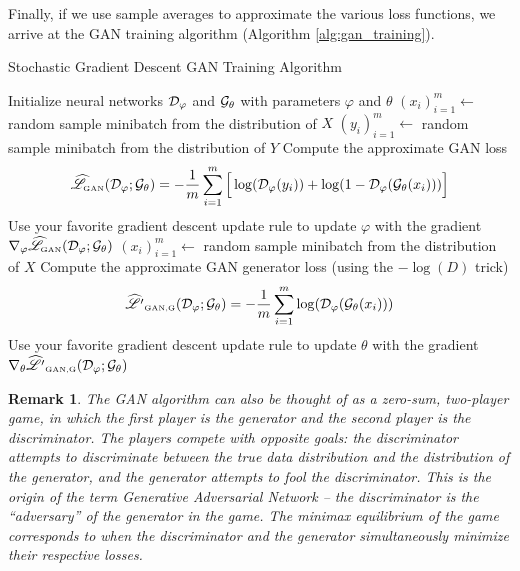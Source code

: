 \documentclass{article}
\newtheorem{remark}{Remark}
\begin{document}
	Finally, if we use sample averages to approximate the various loss functions, we arrive at the GAN training algorithm (Algorithm \ref{alg:gan_training}).

	\newcommand{\approxlossgan}{\widehat{\mathscr{L}}_{\textnormal{\tiny GAN}}}
	\newcommand{\approxlossgangenerator}{\widehat{\mathscr{L}'}_{\textnormal{\tiny GAN,G}}}
	\begin{algorithm}
		\caption{Stochastic Gradient Descent GAN Training Algorithm}\label{alg:gan_training}
		\begin{algorithmic}
			\State Initialize neural networks \(\mathcal{D}_\varphi\) and \(\mathcal{G}_\theta\) with parameters \(\varphi\) and \(\theta\)
					\State \(\left(x_i\right)_{i=1}^m \gets \) random sample minibatch from the distribution of \(X\)
					\State \(\left(y_i\right)_{i=1}^m \gets \) random sample minibatch from the distribution of \(Y\)
					\State Compute the approximate GAN loss
					\begin{equation*}
						\approxlossgan(\discriminator_\varphi; \generator_\theta) = -\frac{1}{m}\sum_{i=1}^m \Big[\log(\discriminator_\varphi(y_i)) + \log(1-\discriminator_\varphi(\generator_\theta(x_i)))\Big]
					\end{equation*}
					\State Use your favorite gradient descent update rule to update \(\varphi\) with the gradient \(\nabla_\varphi\approxlossgan(\discriminator_\varphi; \generator_\theta)\)
				\EndFor
				\State \(\left(x_i\right)_{i=1}^m \gets \) random sample minibatch from the distribution of \(X\)
				\State Compute the approximate GAN generator loss (using the \(-\log(D)\) trick)
				\begin{equation*}
					\approxlossgangenerator(\discriminator_\varphi; \generator_\theta) = -\frac{1}{m}\sum_{i=1}^m\log(\discriminator_\varphi(\generator_\theta(x_i)))
				\end{equation*}
				\State Use your favorite gradient descent update rule to update \(\theta\) with the gradient \(\nabla_\theta\approxlossgangenerator(\discriminator_\varphi; \generator_\theta)\)
			\EndFor
		\end{algorithmic}
	\end{algorithm}
	
	\begin{remark}\label{rmk:gan_remark}
		The GAN algorithm can also be thought of as a zero-sum, two-player game, in which the first player is the generator and the second player is the discriminator. The players compete with opposite goals: the discriminator attempts to discriminate between the true data distribution and the distribution of the generator, and the generator attempts to fool the discriminator. This is the origin of the term Generative Adversarial Network -- the discriminator is the ``adversary'' of the generator in the game. The minimax equilibrium of the game corresponds to when the discriminator and the generator simultaneously minimize their respective losses.
	\end{remark}
	
\end{document}
